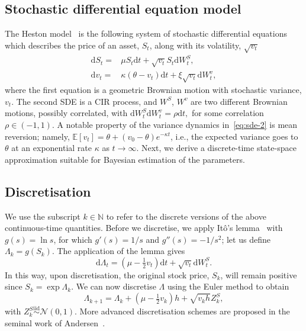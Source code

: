 \documentclass[11pt]{report}
\newcommand{\N}{\mathbb{N}}
\newcommand{\E}{\mathbb{E}}
\newcommand{\dd}{\mathrm{d}}
\begin{document}
\subsection{Stochastic differential equation model}
The Heston model~\cite{heston2015} is the following system of stochastic differential 
equations which describes the price of an asset, $S_t$, along with 
its volatility, $\sqrt{v_t}$
\begin{subequations}
\begin{align}
\dd S_t ={}& \mu S_t \dd t + \sqrt{v_t}S_t \dd W_t^S,
\label{eq:sde-1}
\\
\dd v_t  ={}& \kappa(\theta-v_t)\dd t + \xi \sqrt{v_t}\dd W_t^v,
\label{eq:sde-2}
\end{align}
\end{subequations}
where the first equation is a geometric Brownian motion with stochastic variance, 
$v_t$. The second SDE is a CIR process, and $W^S$, $W^v$ are two different 
Brownian motions, possibly correlated, with $\dd W^S_t \dd W^v_t = \rho \dd t,$
for some correlation $\rho \in (-1, 1)$. 
A notable property of the variance dynamics in~\eqref{eq:sde-2} is mean reversion;
namely, $\E[v_t] = \theta + (v_0 - \theta)e^{-\kappa t}$, i.e., the expected variance 
goes to $\theta$ at an exponential rate $\kappa$ as $t\to\infty$. 
Next, we derive a discrete-time state-space approximation suitable for 
Bayesian estimation of the parameters.

\subsection{Discretisation}
We use the subscript $k\in\N$ to refer to the discrete versions of the above
continuous-time quantities.
Before we discretise, we apply It\^{o}'s lemma~\cite{oksendal2014stochastic} 
with $g(s) = \ln s$, for which $g'(s) = 1/s$ and $g''(s) = -1/s^2$; let us define 
$\Lambda_k = g(S_k)$. The application of the lemma gives 
\begin{equation}
\dd \Lambda_t = \left(\mu - \tfrac{1}{2} v_t\right)\dd t + \sqrt{v_t}\dd W_t^S.    
\end{equation}
In this way, upon discretisation, the original stock price,
$S_k$, will remain positive since $S_k = \exp \Lambda_k$. 
We can now discretise $\Lambda$ using the Euler method
to obtain
\begin{equation}
    \Lambda_{k+1} 
{}={} 
    \Lambda_k 
    + \left(\mu - \tfrac{1}{2}v_k\right)h 
    + \sqrt{v_k h} Z_k^S,
\label{eq:lambda-updates}
\end{equation}
with $Z_k^S \overset{\text{iid}}{\sim} \mathcal{N}(0, 1)$.
More advanced discretisation schemes are proposed in the seminal 
work of Andersen~\cite{Andersen2007}.
\end{document}
